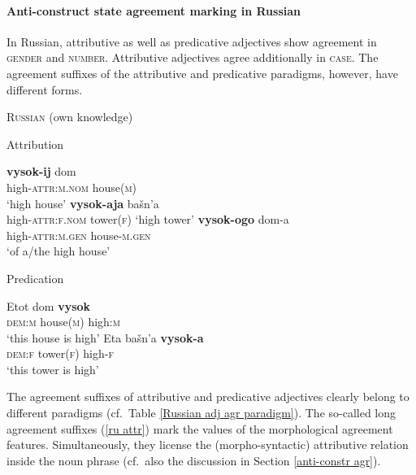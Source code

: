\paragraph{Anti-construct state agreement marking in Russian} \label{russian synchr}
In Russian, attributive as well as predicative adjectives show agreement in \textsc{gender} and \textsc{number}. Attributive adjectives agree additionally in \textsc{case}. The agreement suffixes of the attributive and predicative paradigms, however, have different forms.
\begin{exe}
\ex \textsc{Russian} (own knowledge)\label{ru agr}
\begin{xlist}
\ex	Attribution \label{ru attr}
\begin{xlist}
\ex
\gll 	\textbf{vysok-ij} 		dom\\
	high-\textsc{attr:m.nom} house(\textsc{m})\\
\glt	 ‘high house’
\ex	\textbf{vysok-aja}	bašn'a\\
	high-\textsc{attr:f.nom} 	tower(\textsc{f})
\glt	‘high tower’
\ex	
\gll	\textbf{vysok-ogo}	dom-a\\
	high-\textsc{attr:m.gen}	house-\textsc{m.gen}\\
\glt	‘of a/the high house’
\end{xlist}
\ex	Predication
\begin{xlist}
\ex
\gll 	Etot 	dom	\textbf{vysok}\\
	\textsc{dem:m} house(\textsc{m}) 	high:\textsc{m}\\
\glt	 ‘this house is high’
\ex	
\gll	Eta 	bašn'a	\textbf{vysok-a}\\
	\textsc{dem:f} tower(\textsc{f}) 	high-\textsc{f}\\
\glt	‘this tower is high’
\end{xlist}
\end{xlist}
\end{exe}
The agreement suffixes of attributive and predicative adjectives clearly belong to different paradigms (cf.~Table \ref{Russian adj agr paradigm}). The so-called long agreement suffixes (\ref{ru attr}) mark the values of the morphological agreement features. Simultaneously, they license the (morpho-syntactic) attributive relation inside the noun phrase (cf.~also the discussion in Section \ref{anti-constr agr}). 

